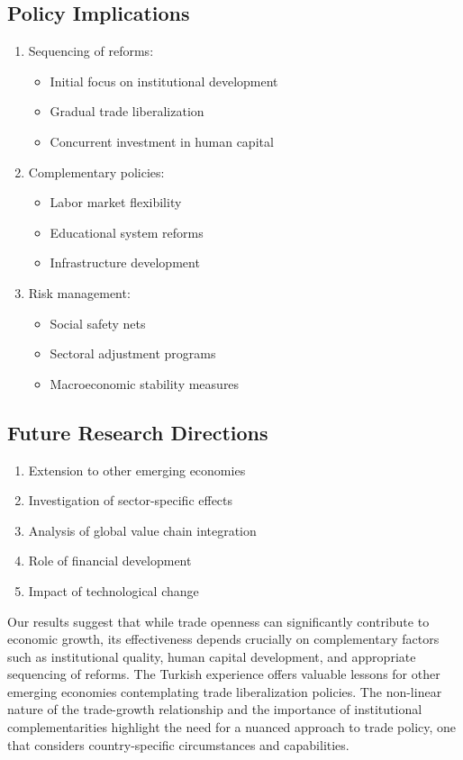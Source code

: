 \documentclass[12pt,a4paper]{article}
\theoremstyle{definition}
\begin{document}
\subsection{Policy Implications}
\begin{enumerate}
    \item Sequencing of reforms:
    \begin{itemize}
        \item Initial focus on institutional development
        \item Gradual trade liberalization
        \item Concurrent investment in human capital
    \end{itemize}
    
    \item Complementary policies:
    \begin{itemize}
        \item Labor market flexibility
        \item Educational system reforms
        \item Infrastructure development
    \end{itemize}
    
    \item Risk management:
    \begin{itemize}
        \item Social safety nets
        \item Sectoral adjustment programs
        \item Macroeconomic stability measures
    \end{itemize}
\end{enumerate}

\subsection{Future Research Directions}
\begin{enumerate}
    \item Extension to other emerging economies
    \item Investigation of sector-specific effects
    \item Analysis of global value chain integration
    \item Role of financial development
    \item Impact of technological change
\end{enumerate}

Our results suggest that while trade openness can significantly contribute to economic growth, its effectiveness depends crucially on complementary factors such as institutional quality, human capital development, and appropriate sequencing of reforms. The Turkish experience offers valuable lessons for other emerging economies contemplating trade liberalization policies. The non-linear nature of the trade-growth relationship and the importance of institutional complementarities highlight the need for a nuanced approach to trade policy, one that considers country-specific circumstances and capabilities.
\end{document}
